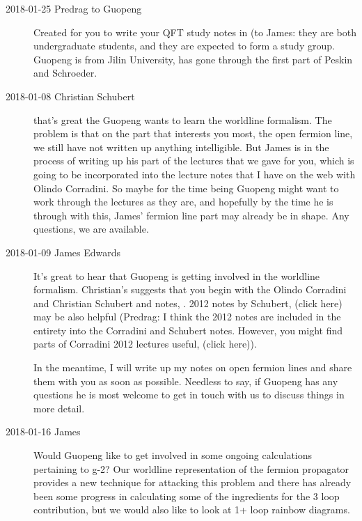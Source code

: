 \begin{description}

\item[2018-01-25  Predrag to Guopeng]
    Created  for you to write your QFT study notes
    in (to James: they are both undergraduate students, and they are
    expected to form a study group.
    Guopeng is from Jilin University, has gone
    through the first part of Peskin and Schroeder.

\item[2018-01-08 Christian Schubert]
that's great the Guopeng wants to learn the worldline formalism. The problem
is that on the part that interests you most, the open fermion line, we
still have not written up anything intelligible. But James is in
the process of writing up his part of the lectures that we gave for you,
which is going to be incorporated into the lecture notes that I have on
the web with Olindo Corradini. So maybe for the time being Guopeng might
want to work through the lectures as they are, and hopefully by the time
he is through with this, James' fermion line part may already be in shape.
Any questions, we are available.

\item[2018-01-09 James Edwards ]
It's great to hear that Guopeng is getting involved in the worldline
formalism. Christian's suggests that you begin with the Olindo Corradini
and Christian Schubert and
 notes, . 2012 notes by
Schubert,
{(click here)} may be also helpful
(Predrag: I think the 2012 notes are included in the entirety into the
Corradini and Schubert  notes. However, you might find parts of
Corradini 2012 lectures useful,
{(click here)}).

In the meantime, I will write up my notes on open fermion lines and share
them with you as soon as possible. Needless to say, if Guopeng has any
questions he is most welcome to get in touch with us to discuss things in
more detail.

\item[2018-01-16 James]
Would Guopeng like to get involved in some ongoing calculations pertaining
to g-2? Our worldline representation of the fermion propagator provides a
new technique for attacking this problem and there has already been some
progress in calculating some of the ingredients for the 3 loop
contribution, but we would also like to look at 1+ loop rainbow diagrams.


\end{description}
